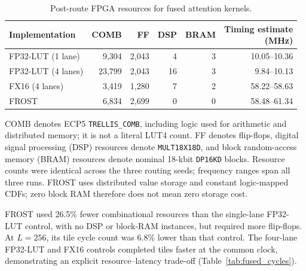 \begin{table}[!htbp]
\centering
\caption{Post-route FPGA resources for fused attention kernels.}
\label{tab:fused_fpga_resources}
\small\setlength{\tabcolsep}{3pt}
\begin{tabular*}{\linewidth}{@{\extracolsep{\fill}}lrrrrr@{}}
\toprule
Implementation & COMB & FF & DSP & BRAM & \shortstack{Timing estimate\\(MHz)}\\
\midrule
FP32-LUT (1 lane) & 9,304 & 2,043 & 4 & 3 & 10.05--10.36 \\
FP32-LUT (4 lanes) & 23,799 & 2,043 & 16 & 3 & 9.84--10.13 \\
FX16 (4 lanes) & 3,419 & 1,280 & 7 & 2 & 58.22--58.63 \\
FROST & 6,834 & 2,699 & 0 & 0 & 58.48--61.34 \\
\bottomrule
\end{tabular*}
\par\smallskip\footnotesize
COMB denotes ECP5 \texttt{TRELLIS\_COMB}, including logic used for
arithmetic and distributed memory; it is not a literal LUT4 count.
FF denotes flip-flops, digital signal processing (DSP) resources denote \texttt{MULT18X18D}, and block random-access memory (BRAM) resources denote
nominal 18-kbit \texttt{DP16KD} blocks. Resource counts were identical
across the three routing seeds; frequency ranges span all three runs.
FROST uses distributed value storage and constant logic-mapped CDFs;
zero block RAM therefore does not mean zero storage cost.
\end{table}

FROST used 26.5\% fewer combinational resources than the
single-lane FP32-LUT control, with no DSP or block-RAM instances, but
required more flip-flops. At $L=256$, its tile cycle count was
6.8\% lower than that control. The four-lane FP32-LUT and FX16
controls completed tiles faster at the common clock, demonstrating an
explicit resource--latency trade-off (Table~\ref{tab:fused_cycles}).

